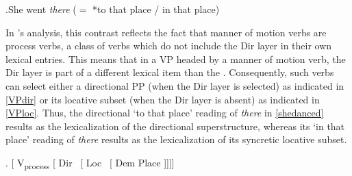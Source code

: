 \ex.\label{loc-there}She went \textit{there} ($=$ *to that place / in that place)\label{shewent}

\noindent In \citeauthor{GVW-Olinco}'s \citeyearpar{GVW-Olinco} analysis, this contrast reflects the fact that manner of motion verbs are process verbs, a class of verbs which do not include the Dir layer in their own lexical entries. This means that in a VP headed by a manner of motion verb, the Dir layer is part of a different lexical item than the . Consequently, such verbs can select either a directional PP (when the Dir layer is selected) as indicated in \ref{VPdir} or its locative subset (when the Dir layer is absent) as indicated in \ref{VPloc}. Thus, the directional `to that place' reading of \textit{there} in \ref{shedanced} results as the lexicalization of the directional superstructure, whereas its `in that place' reading of \textit{there} results as the lexicalization of its syncretic locative subset.

\ex. [ V\textsubscript{process} [ Dir \ [ Loc \ [ Dem Place ]]]]\label{VPdir}

